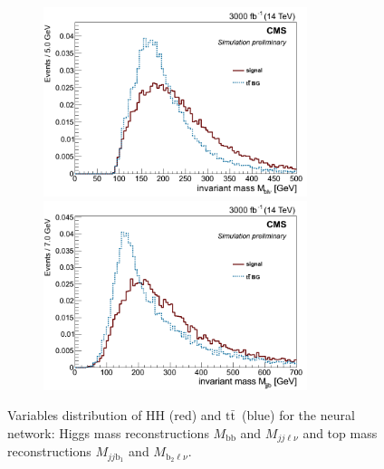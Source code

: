 \documentclass[10pt,a4paper]{article}
\newcommand{\ww}{7.7cm} %
\newcommand{\dd}{-2mm} %
\renewcommand{\tt}{\ensuremath{\text{t}\bar{\text{t}}}}
\newcommand{\lnu}{$\ell\nu$}
\newcommand{\bb}{\text{bb}}
\begin{document}
\begin{figure}[h]
  \begin{subfigure}[b]{17cm}
    \begin{minipage}[h!]{\ww}
      \centering
      \includegraphics[width=\ww]{figs/M_blnu.png}
    \end{minipage}
    \begin{minipage}[h!]{\ww}
      \centering
      \includegraphics[width=\ww]{figs/M_jjb.png}
    \end{minipage}
    \hspace{9mm}
  \end{subfigure}	
  \vspace{\dd}
  \caption{Variables distribution of HH (red) and \tt\ (blue) for the neural network: Higgs mass reconstructions $M_{\bb}$ and $M_{jj\ell\nu}$ and top mass reconstructions $M_{jj\text{b}_1}$ and $M_{\text{b}_2\text{\lnu}}$.} \label{vars7}

\end{figure}
\end{document}
